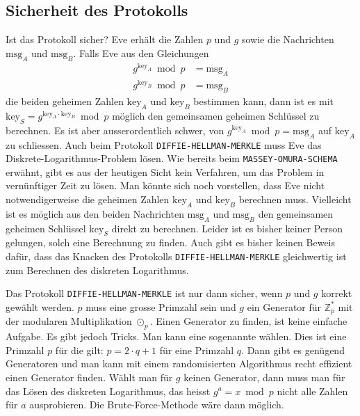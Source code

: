 \subsection{Sicherheit des Protokolls}

Ist das Protokoll sicher? Eve erhält die Zahlen $p$ und $g$ sowie die Nachrichten $\text{msg}_A$ und $\text{msg}_B$. Falls Eve aus den Gleichungen
\begin{align*}
	g^{\text{key}_A} \bmod p & = \text{msg}_A \\
	g^{\text{key}_B} \bmod p & = \text{msg}_B
\end{align*}
die beiden geheimen Zahlen $\text{key}_A$ und $\text{key}_B$ bestimmen kann, dann ist es mit $\text{key}_S = g^{\text{key}_A \cdot \text{key}_B} \bmod p$ möglich den gemeinsamen geheimen Schlüssel zu berechnen. Es ist aber ausserordentlich schwer, von $g^{\text{key}_A} \bmod p = \text{msg}_A$ auf $\text{key}_A$ zu schliessen. Auch beim Protokoll \texttt{DIFFIE-HELLMAN-MERKLE} muss Eve das Diskrete-Logarithmus-Problem lösen. Wie bereits beim \texttt{MASSEY-OMURA-SCHEMA} erwähnt, gibt es aus der heutigen Sicht kein Verfahren, um das Problem in vernünftiger Zeit zu lösen. Man könnte sich noch vorstellen, dass Eve nicht notwendigerweise die geheimen Zahlen $\text{key}_A$ und $\text{key}_B$ berechnen muss. Vielleicht ist es möglich aus den beiden Nachrichten $\text{msg}_A$ und $\text{msg}_B$ den gemeinsamen geheimen Schlüssel $\text{key}_S$ direkt zu berechnen. Leider ist es bisher keiner Person gelungen, solch eine Berechnung zu finden. Auch gibt es bisher keinen Beweis dafür, dass das Knacken des Protokolls \texttt{DIFFIE-HELLMAN-MERKLE} gleichwertig ist zum Berechnen des diskreten Logarithmus.

\begin{important}
	Das Protokoll \texttt{DIFFIE-HELLMAN-MERKLE} ist nur dann sicher, wenn $p$ und $g$ korrekt gewählt werden. $p$ muss eine grosse Primzahl sein und $g$ ein Generator für $\mathbb{Z}_{p}^*$ mit der modularen Multiplikation $\odot_{p}$. Einen Generator zu finden, ist keine einfache Aufgabe. Es gibt jedoch Tricks. Man kann eine sogenannte  wählen. Dies ist eine Primzahl $p$ für die gilt: $p = 2 \cdot q + 1$ für eine Primzahl $q$. Dann gibt es genügend Generatoren und man kann mit einem randomisierten Algorithmus recht effizient einen Generator finden. Wählt man für $g$ keinen Generator, dann muss man für das Lösen des diskreten Logarithmus, das heisst $g^a = x \bmod p$ nicht alle Zahlen für $a$ ausprobieren. Die Brute-Force-Methode wäre dann möglich.
\end{important}

